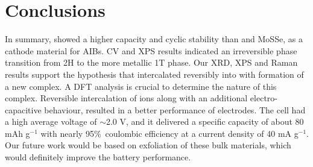 \section{Conclusions}
In summary,  showed a higher capacity and cyclic stability than  and MoSSe, as a cathode material for AIBs. CV and XPS results indicated an irreversible phase transition from 2H to the more metallic 1T phase. Our XRD, XPS and Raman results support the hypothesis that  intercalated reversibly into  with formation of a new complex. A DFT analysis is crucial to determine the nature of this complex. Reversible intercalation of ions along with an additional electro-capacitive behaviour, resulted in a better performance of  electrodes. The cell had a high average voltage of $\sim$2.0 V, and it delivered a specific capacity of about 80 mAh g$^{-1}$ with nearly 95\%\ coulombic efficiency at a current density of 40 mA g$^{-1}$. Our future work would be based on exfoliation of these bulk materials, which would definitely improve the battery performance. 


